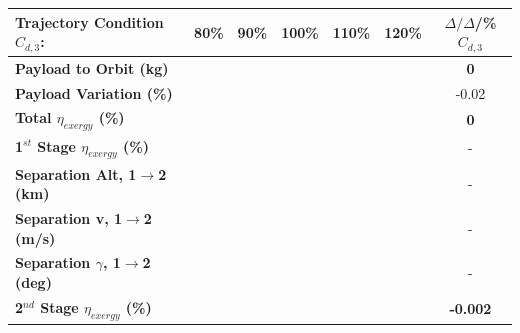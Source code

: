 \begin{table}[ht]
	\centering
	\begin{tabular}{l c c c c c c} 
		\hline \textbf{Trajectory Condition}   \qquad  $C_{d,3}$:
		&80\%
		&90\%
		&100\%
		&110\%
		&120\%
		& $\Delta/\Delta$/\%$C_{d,3}$
		\\
		\hline \textbf{Payload to Orbit (kg)}
		& \textbf{\PayloadToOrbitCdThreeEightyNoReturn}
		& \textbf{\PayloadToOrbitCdThreeNinetyNoReturn}
		& \textbf{\PayloadToOrbitCdThreeStandardNoReturn}
		& \textbf{\PayloadToOrbitCdThreeOneHundredTenNoReturn}
		& \textbf{\PayloadToOrbitCdThreeOneHundredTwentyNoReturn}
		&\textbf{0}
		\\
		\textbf{Payload Variation (\%)}
		& \PayloadVarCdThreeEightyNoReturn
		& \PayloadVarCdThreeNinetyNoReturn
		& \PayloadVarCdThreeStandardNoReturn
		& \PayloadVarCdThreeOneHundredTenNoReturn
		& \PayloadVarCdThreeOneHundredTwentyNoReturn
		&-0.02
		\\
		\textbf{Total $\eta_{exergy}$ (\%)}
		& \textbf{\totalExergyEffCdThreeEightyNoReturn}
		& \textbf{\totalExergyEffCdThreeNinetyNoReturn}
		& \textbf{\totalExergyEffCdThreeStandardNoReturn}
		& \textbf{\totalExergyEffCdThreeOneHundredTenNoReturn}
		& \textbf{\totalExergyEffCdThreeOneHundredTwentyNoReturn}
		& \textbf{0}
		\\
		\hline 
		\textbf{1$^{st}$ Stage $\eta_{exergy}$ (\%)}
		& \textbf{\firstExergyEffCdThreeEightyNoReturn}
		& \textbf{\firstExergyEffCdThreeNinetyNoReturn}
		& \textbf{\firstExergyEffCdThreeStandardNoReturn}
		& \textbf{\firstExergyEffCdThreeOneHundredTenNoReturn}
		& \textbf{\firstExergyEffCdThreeOneHundredTwentyNoReturn}
		& -
		\\
	
		\textbf{Separation Alt, 1$\rightarrow$2 (km)}
		& \firstsecondSeparationAltCdThreeEightyNoReturn
		& \firstsecondSeparationAltCdThreeNinetyNoReturn
		& \firstsecondSeparationAltCdThreeStandardNoReturn
		& \firstsecondSeparationAltCdThreeOneHundredTenNoReturn
		& \firstsecondSeparationAltCdThreeOneHundredTwentyNoReturn
		& -
		\\
		\textbf{Separation v, 1$\rightarrow$2 (m/s)}
		& \firstsecondSeparationvCdThreeEightyNoReturn
		& \firstsecondSeparationvCdThreeNinetyNoReturn
		& \firstsecondSeparationvCdThreeStandardNoReturn
		& \firstsecondSeparationvCdThreeOneHundredTenNoReturn
		& \firstsecondSeparationvCdThreeOneHundredTwentyNoReturn
		& -
		\\
		\textbf{Separation $\gamma$, 1$\rightarrow$2 (deg)}
		& \firstsecondSeparationgammaCdThreeEightyNoReturn
		& \firstsecondSeparationgammaCdThreeNinetyNoReturn
		& \firstsecondSeparationgammaCdThreeStandardNoReturn
		& \firstsecondSeparationgammaCdThreeOneHundredTenNoReturn
		& \firstsecondSeparationgammaCdThreeOneHundredTwentyNoReturn
		& -
		\\
		\hline 
		\textbf{2$^{nd}$ Stage $\eta_{exergy}$ (\%)}
		& \textbf{\secondExergyEffCdThreeEightyNoReturn}
		& \textbf{\secondExergyEffCdThreeNinetyNoReturn}
		& \textbf{\secondExergyEffCdThreeStandardNoReturn}
		& \textbf{\secondExergyEffCdThreeOneHundredTenNoReturn}
		& \textbf{\secondExergyEffCdThreeOneHundredTwentyNoReturn}
		& \textbf{-0.002}
		\\


\end{tabular}
\end{table}
